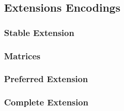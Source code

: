 \subsection{Extensions Encodings}
\subsubsection{Stable Extension}


\subsubsection{Matrices}
\subsubsection{Preferred Extension}
\subsubsection{Complete Extension}
